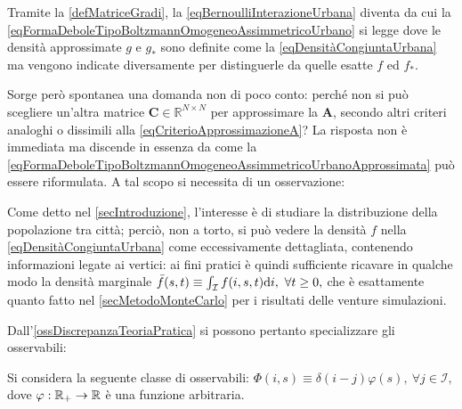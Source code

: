       Tramite la \cref{defMatriceGradi}, la \ref{eqBernoulliInterazioneUrbana} diventa
      da cui la \ref{eqFormaDeboleTipoBoltzmannOmogeneoAssimmetricoUrbano} si legge
      dove le densità approssimate \(g\) e \(g_*\) sono definite come la \cref{eqDensitàCongiuntaUrbana} ma vengono indicate diversamente per distinguerle da quelle esatte \(f\) ed \(f_*\).

      Sorge però spontanea una domanda non di poco conto: perché non si può scegliere un'altra matrice \(\mathbf C\in\mathbb R^{N\times N}\) per approssimare la \(\mathbf A\), secondo altri criteri analoghi o dissimili alla \cref{eqCriterioApprossimazioneA}? La risposta non è immediata ma discende in essenza da come la \ref{eqFormaDeboleTipoBoltzmannOmogeneoAssimmetricoUrbanoApprossimata} può essere riformulata. A tal scopo si necessita di un osservazione:

      \begin{oss}
        \label{ossDiscrepanzaTeoriaPratica}
        Come detto nel \cref{secIntroduzione}, l'interesse è di studiare la distribuzione della popolazione tra città; perciò, non a torto, si può vedere la densità \(f\) nella \cref{eqDensitàCongiuntaUrbana} come eccessivamente dettagliata, contenendo informazioni legate ai vertici: ai fini pratici è quindi sufficiente ricavare in qualche modo la densità marginale 
        \( 
          \bar f(s,t)\equiv\int_{\mathcal I}f(i,s,t)\mathrm{d} i,\ \forall t\geq0,
        \) 
        che è esattamente quanto fatto nel \cref{secMetodoMonteCarlo} per i risultati delle venture simulazioni.
      \end{oss}

      Dall'\cref{ossDiscrepanzaTeoriaPratica} si possono pertanto specializzare gli osservabili:
     
      \begin{ipo}
        \label{ipOsservabileUrbanoNodale}
        Si considera la seguente classe di osservabili: 
        \(
          \Phi(i,s)\equiv\delta(i-j)\varphi(s),\ \forall j\in\mathcal I,
        \) 
        dove \(\varphi:\mathbb R_+\to\mathbb R\) è una funzione arbitraria.
      \end{ipo}
      
